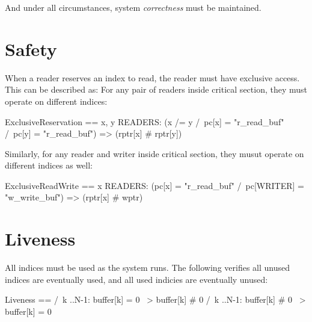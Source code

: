And under all circumstances, system \textit{correctness} must be maintained.

\section{Safety}

When a reader reserves an index to read, the reader must have exclusive access. 
This can be described as: For any pair of readers inside critical section, they
must operate on different indices:\newline

\begin{tla}
ExclusiveReservation == 
    \A x, y \in READERS: 
        (x /= y /\ pc[x] = "r_read_buf" /\ pc[y] = "r_read_buf") 
            => (rptr[x] # rptr[y])
\end{tla}
\begin{tlatex}
%
%
%
\end{tlatex}
\newline

Similarly, for any reader and writer inside critical section, they musut operate
on different indices as well:\newline
\begin{tla}
ExclusiveReadWrite == 
    \A x \in READERS: 
        (pc[x] = "r_read_buf" /\ pc[WRITER] = "w_write_buf") => (rptr[x] # wptr)
\end{tla}
\begin{tlatex}
%
%
\end{tlatex}

\section{Liveness}

All indices must be used as the system runs. The following verifies all unused
indices are eventually used, and all used indicies are eventually unused:
\newline
\begin{tla}
Liveness ==
    /\ \A k ..N-1:
        buffer[k] = 0 ~> buffer[k] # 0
    /\ \A k ..N-1:
        buffer[k] # 0 ~> buffer[k] = 0
\end{tla}
\begin{tlatex}
%
%
%
%
%
\end{tlatex}
\newline

